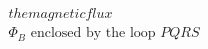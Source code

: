 \documentclass[preview]{standalone}
\begin{document}
\begin{align*}
the magnetic flux \\ \Phi_B \text{ enclosed by the loop } PQRS
\end{align*}
\end{document}
